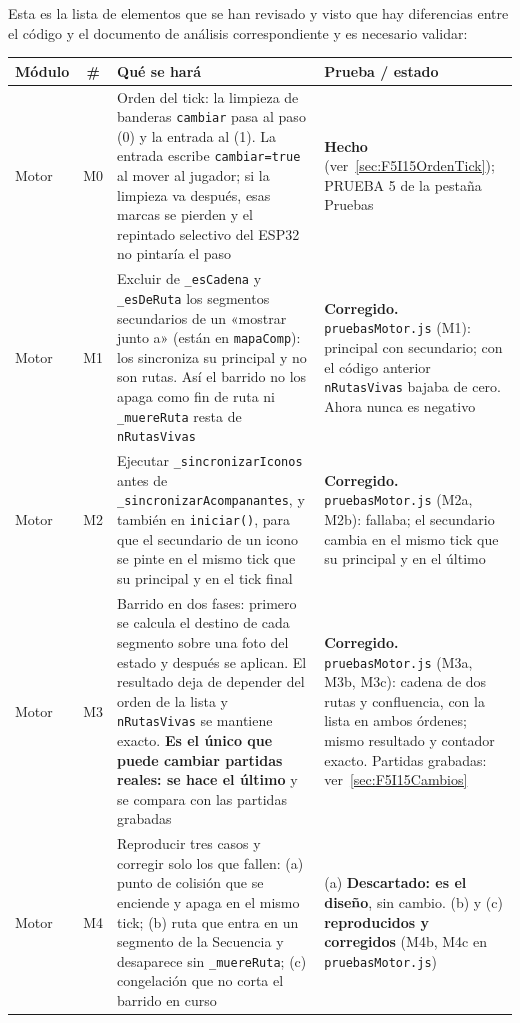 Esta es la lista de elementos que se han revisado y visto que hay diferencias entre el código y el documento de análisis correspondiente y es necesario validar:

\begin{xltabular}{\textwidth}{l c >{\RaggedRight\arraybackslash}X >{\RaggedRight\arraybackslash}X}
	\toprule
	\textbf{Módulo} & \textbf{\#} & \textbf{Qué se hará} & \textbf{Prueba / estado} \\
	\midrule
	\endhead
	Motor & M0 & Orden del tick: la limpieza de banderas \texttt{cambiar} pasa al paso (0) y la entrada al (1). La entrada escribe \texttt{cambiar=true} al mover al jugador; si la limpieza va después, esas marcas se pierden y el repintado selectivo del ESP32 no pintaría el paso & \textbf{Hecho} (ver~\ref{sec:F5I15OrdenTick}); PRUEBA 5 de la pestaña Pruebas \\
	Motor & M1 & Excluir de \texttt{\_esCadena} y \texttt{\_esDeRuta} los segmentos secundarios de un «mostrar junto a» (están en \texttt{mapaComp}): los sincroniza su principal y no son rutas. Así el barrido no los apaga como fin de ruta ni \texttt{\_muereRuta} resta de \texttt{nRutasVivas} & \textbf{Corregido.} \texttt{pruebasMotor.js} (M1): principal con secundario; con el código anterior \texttt{nRutasVivas} bajaba de cero. Ahora nunca es negativo \\
	Motor & M2 & Ejecutar \texttt{\_sincronizarIconos} antes de \texttt{\_sincronizarAcompanantes}, y también en \texttt{iniciar()}, para que el secundario de un icono se pinte en el mismo tick que su principal y en el tick final & \textbf{Corregido.} \texttt{pruebasMotor.js} (M2a, M2b): fallaba; el secundario cambia en el mismo tick que su principal y en el último \\
	Motor & M3 & Barrido en dos fases: primero se calcula el destino de cada segmento sobre una foto del estado y después se aplican. El resultado deja de depender del orden de la lista y \texttt{nRutasVivas} se mantiene exacto. \textbf{Es el único que puede cambiar partidas reales: se hace el último} y se compara con las partidas grabadas & \textbf{Corregido.} \texttt{pruebasMotor.js} (M3a, M3b, M3c): cadena de dos rutas y confluencia, con la lista en ambos órdenes; mismo resultado y contador exacto. Partidas grabadas: ver~\ref{sec:F5I15Cambios} \\
	Motor & M4 & Reproducir tres casos y corregir solo los que fallen: (a) punto de colisión que se enciende y apaga en el mismo tick; (b) ruta que entra en un segmento de la Secuencia y desaparece sin \texttt{\_muereRuta}; (c) congelación que no corta el barrido en curso & (a) \textbf{Descartado: es el diseño}, sin cambio. (b) y (c) \textbf{reproducidos y corregidos} (M4b, M4c en \texttt{pruebasMotor.js}) \\

\end{xltabular}
